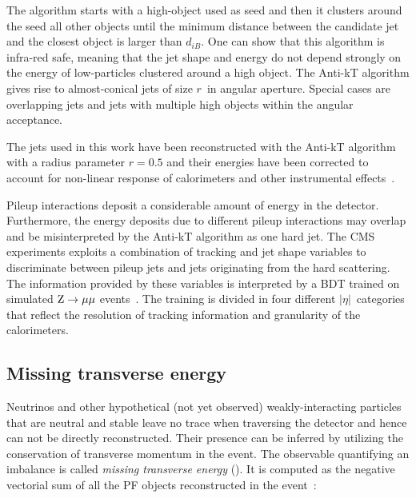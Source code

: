 The algorithm starts with a high-\pT object used as seed and then it clusters around the seed all other objects until the minimum distance between the candidate jet and the closest object is larger than $d_{iB}$. One can show that this algorithm is infra-red safe, meaning that the jet shape and energy do not depend strongly on the energy of low-\pT particles clustered around a high \pT object. The Anti-kT algorithm gives rise to almost-conical jets of size $r$\ in angular aperture. Special cases are overlapping jets and jets with multiple high \pT objects within the angular acceptance.

The jets used in this work have been reconstructed with the Anti-kT algorithm with a radius parameter $r=0.5$ and their energies have been corrected to account for non-linear response of calorimeters and other instrumental effects~\cite{Chatrchyan:2011ds}.

Pileup interactions deposit a considerable amount of energy in the detector. %
Furthermore, the energy deposits due to different pileup interactions may overlap and be misinterpreted by the Anti-kT algorithm as one hard jet. The CMS experiments exploits a combination of tracking and jet shape variables to discriminate between pileup jets and jets originating from the hard scattering. The information provided by these variables is interpreted by a BDT 
trained on simulated $\mathrm{Z}\rightarrow\mu\mu$ events~\cite{CMS-PAS-JME-13-005}. The training is divided in four different $|\eta|$\ categories that reflect the resolution of tracking information and granularity of the calorimeters.

\subsection{Missing transverse energy}

Neutrinos and other hypothetical (not yet observed) weakly-interacting particles that are neutral and stable leave no trace when traversing the detector and hence can not be directly reconstructed. Their presence can be inferred by utilizing the conservation of transverse momentum in the event. The observable quantifying an imbalance is called \emph{missing transverse energy} (\MET). It is computed as the negative vectorial sum of all the PF objects reconstructed in the event~\cite{CMS-PAS-JME-13-003}: 

